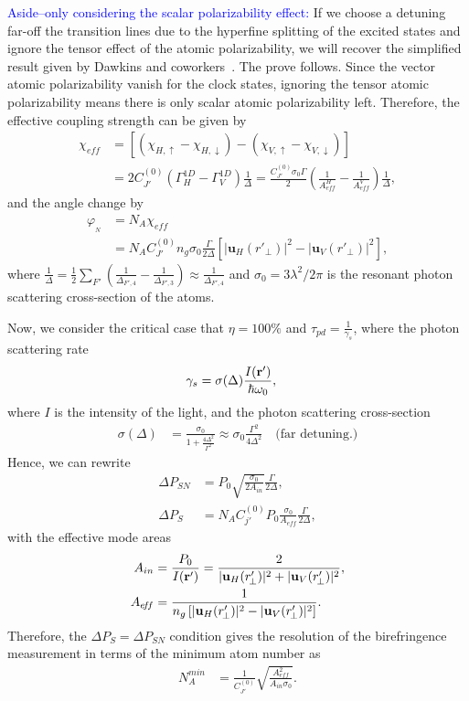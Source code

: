 \documentclass[preprint,aps,pra,onecolumn]{revtex4-1} %
\begin{document}
\textcolor{blue}{Aside--only considering the scalar polarizability effect:} If we choose a detuning far-off 
the 
transition lines due to the hyperfine splitting 
of the excited states and ignore the tensor effect of the atomic polarizability, we will recover the 
simplified 
result given by Dawkins and coworkers~\cite{Dawkins2011}. 
The prove follows. Since the vector 
atomic polarizability vanish for the clock states, ignoring the tensor atomic polarizability means there is 
only scalar atomic polarizability left.
Therefore, the effective coupling strength can be given by 
\begin{align}
\chi_{e\!f\!f} &=[(\chi_{H,\uparrow}-\chi_{H,\downarrow})-(\chi_{V,\uparrow}-\chi_{V,\downarrow})]\\
&= 2C_{J'}^{(0)}(\Gamma_{H}^{1D}-\Gamma_V^{1D})\frac{1}{\Delta}
=\frac{C_{J'}^{(0)}\sigma_0\Gamma}{2}(\frac{1}{A^H_{e\!f\!f}}-\frac{1}{A^V_{e\!f\!f}})\frac{1}{\Delta},
\end{align} 
and the angle change by
\begin{align}
\varphi_{_N} &= N_A \chi_{e\!f\!f}\\
&=N_AC_{J'}^{(0)}n_g\sigma_0\frac{\Gamma}{2\Delta}\left[| \mathbf{u}_H(r'_{\!\perp})|^2- | 
\mathbf{u}_V(r'_{\!\perp})|^2 \right],
\end{align}
where $\frac{1}{\Delta}=\frac{1}{2}\sum_{F'}(\frac{1}{\Delta_{F',4}}-\frac{1}{\Delta_{F',3}})\approx \frac{1}{\Delta_{F',4}}$ and $ \sigma_0=3\lambda^2/2\pi $ is the resonant photon scattering cross-section of the atoms.

Now, we consider the critical case that $\eta =100\%$ and $\tau_{pd} = \frac{1}{\gamma_s}$, where the photon scattering rate
\begin{align}
\gamma_s &= \sigma(\Delta) \frac{I(\mathbf{r}')}{\hbar \omega_0}, 
\end{align}
where $ I $ is the intensity of the light, and the photon scattering cross-section
\begin{align}
\sigma(\Delta) &=\frac{\sigma_0}{1+\frac{4\Delta^2}{\Gamma^2}}\approx \sigma_0 
\frac{\Gamma^2}{4\Delta^2} \quad \text{(far detuning.)}
\end{align}
Hence, we can rewrite 
\begin{align}
\Delta P_{SN} &=P_0\sqrt{\frac{ \sigma_0 }{2A_{in}}}\frac{\Gamma}{2\Delta},\\
\Delta P_S &= N_A C_{j'}^{(0)}P_0 \frac{\sigma_0}{A_{e\!f\!f}}\frac{\Gamma}{2\Delta}, 
\end{align}
with the effective mode areas
\begin{align}
A_{in } &= \frac{P_0}{I(\mathbf{r}')}=\frac{2}{| \mathbf{u}_H(r'_{\!\perp})|^2+ | \mathbf{u}_V(r'_{\!\perp})|^2},\\
A_{e\!f\!f} &= \frac{1}{n_g\left[ | \mathbf{u}_H(r'_{\!\perp})|^2- | \mathbf{u}_V(r'_{\!\perp})|^2\right]}.
\end{align}
Therefore, the $ \Delta P_S = \Delta P_{SN}$ condition gives the resolution of the birefringence measurement in terms of the minimum atom number as
\begin{align}
N^{min}_A &= \frac{1}{C_{J'}^{(0)}}\sqrt{\frac{A_{e\!f\!f}^2}{A_{in}\sigma_0}}.
\end{align}
\end{document}
